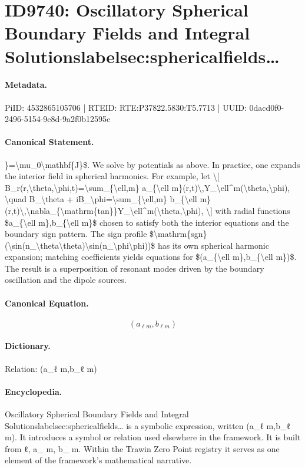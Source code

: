 \section*{ID9740: Oscillatory Spherical Boundary Fields and Integral Solutionslabelsec:sphericalfields…}
\paragraph{Metadata.}
PiID: 4532865105706 | RTEID: RTE:P37822.5830:T5.7713 | UUID: 0dacd0f0-2496-5154-9e8d-9a2f0b12595c

\paragraph{Canonical Statement.}
\}=\textbackslash{}mu\_0\textbackslash{}mathbf\{J\}\$. We solve by potentials as above. In practice, one expands the interior field in spherical harmonics. For example, let \textbackslash{}[ B\_r(r,\textbackslash{}theta,\textbackslash{}phi,t)=\textbackslash{}sum\_\{\textbackslash{}ell,m\} a\_\{\textbackslash{}ell m\}(r,t)\textbackslash{},Y\_\textbackslash{}ell\textasciicircum{}m(\textbackslash{}theta,\textbackslash{}phi), \textbackslash{}quad B\_\textbackslash{}theta + iB\_\textbackslash{}phi=\textbackslash{}sum\_\{\textbackslash{}ell,m\} b\_\{\textbackslash{}ell m\}(r,t)\textbackslash{},\textbackslash{}nabla\_\{\textbackslash{}mathrm\{tan\}\}Y\_\textbackslash{}ell\textasciicircum{}m(\textbackslash{}theta,\textbackslash{}phi), \textbackslash{}] with radial functions \$a\_\{\textbackslash{}ell m\},b\_\{\textbackslash{}ell m\}\$ chosen to satisfy both the interior equations and the boundary sign pattern. The sign profile \$\textbackslash{}mathrm\{sgn\}(\textbackslash{}sin(n\_\textbackslash{}theta\textbackslash{}theta)\textbackslash{}sin(n\_\textbackslash{}phi\textbackslash{}phi))\$ has its own spherical harmonic expansion; matching coefficients yields equations for \$(a\_\{\textbackslash{}ell m\},b\_\{\textbackslash{}ell m\})\$. The result is a superposition of resonant modes driven by the boundary oscillation and the dipole sources.

\paragraph{Canonical Equation.}
\[
(a_{\ell m},b_{\ell m})
\]

\paragraph{Dictionary.}
Relation: (a\_ℓ m,b\_ℓ m)

\paragraph{Encyclopedia.}
Oscillatory Spherical Boundary Fields and Integral Solutionslabelsec:sphericalfields… is a symbolic expression, written (a\_ℓ m,b\_ℓ m). It introduces a symbol or relation used elsewhere in the framework. It is built from ℓ, a\_ m, b\_ m. Within the Trawin Zero Point registry it serves as one element of the framework's mathematical narrative.
